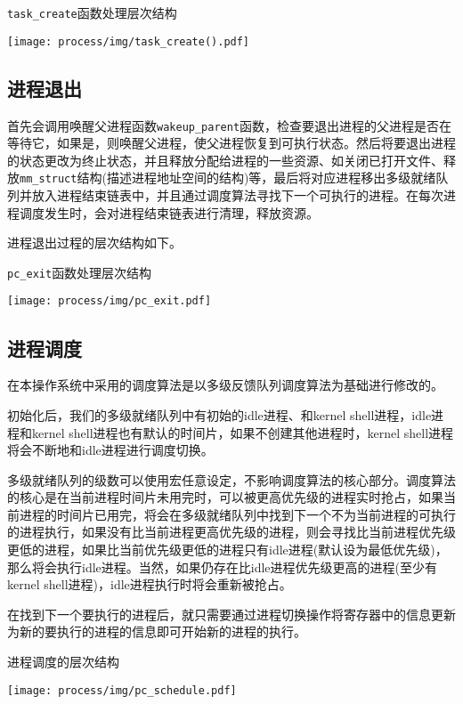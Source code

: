 \begin{table}[H]
  \centering
  \caption{\texttt{task\_create}函数处理层次结构}
  \texttt{[image: process/img/task\_create().pdf]}
\end{table}


\subsection{进程退出}

首先会调用唤醒父进程函数\texttt{wakeup\_parent}函数，检查要退出进程的父进程是否在等待它，如果是，则唤醒父进程，使父进程恢复到可执行状态。然后将要退出进程的状态更改为终止状态，并且释放分配给进程的一些资源、如关闭已打开文件、释放\texttt{mm\_struct}结构(描述进程地址空间的结构)等，最后将对应进程移出多级就绪队列并放入进程结束链表中，并且通过调度算法寻找下一个可执行的进程。在每次进程调度发生时，会对进程结束链表进行清理，释放资源。

进程退出过程的层次结构如下。

\begin{table}[H]
  \centering
  \caption{\texttt{pc\_exit}函数处理层次结构}
  \texttt{[image: process/img/pc\_exit.pdf]}
\end{table}


\subsection{进程调度}

在本操作系统中采用的调度算法是以多级反馈队列调度算法为基础进行修改的。

初始化后，我们的多级就绪队列中有初始的idle进程、和kernel shell进程，idle进程和kernel shell进程也有默认的时间片，如果不创建其他进程时，kernel shell进程将会不断地和idle进程进行调度切换。

多级就绪队列的级数可以使用宏任意设定，不影响调度算法的核心部分。调度算法的核心是在当前进程时间片未用完时，可以被更高优先级的进程实时抢占，如果当前进程的时间片已用完，将会在多级就绪队列中找到下一个不为当前进程的可执行的进程执行，如果没有比当前进程更高优先级的进程，则会寻找比当前进程优先级更低的进程，如果比当前优先级更低的进程只有idle进程(默认设为最低优先级)，那么将会执行idle进程。当然，如果仍存在比idle进程优先级更高的进程(至少有kernel shell进程)，idle进程执行时将会重新被抢占。

在找到下一个要执行的进程后，就只需要通过进程切换操作将寄存器中的信息更新为新的要执行的进程的信息即可开始新的进程的执行。

\begin{table}[H]
  \centering
  \caption{进程调度的层次结构}
  \texttt{[image: process/img/pc\_schedule.pdf]}
\end{table}



